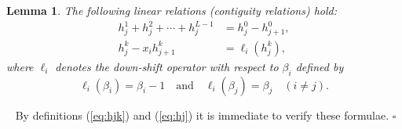 \documentclass[12pt]{article}
\newtheorem{lemma}[thm]{Lemma}
\numberwithin{equation}{section}
\def\pf{\noindent{\it Proof.} \ }
\def\qed{\hfill $\square$}
\begin{document}
\begin{lemma}
The following linear relations {\rm(}contiguity relations{\rm)}
hold{\rm:} 
\begin{align}
\label{eq:cont1}
h^1_j+h^2_j+\cdots+h^{L-1}_j 
&=h^0_j-h^0_{j+1},
\\
\label{eq:cont2}
 h^k_{j}- x_i h^k_{j+1} 
 &= \ell_i (h^k_j),
\end{align}
where $\ell_i$ denotes the down-shift operator 
with respect to $\beta_i$
defined by 
\[
\ell_i(\beta_i)=\beta_i-1 \quad
\text{and} \quad
 \ell_i(\beta_j)=\beta_j \quad (i \neq j).
\]
\end{lemma}

\pf
By  
definitions (\ref{eq:hjk}) and (\ref{eq:hj})
it is immediate to verify these formulae. 
\qed
\\
\end{document}
